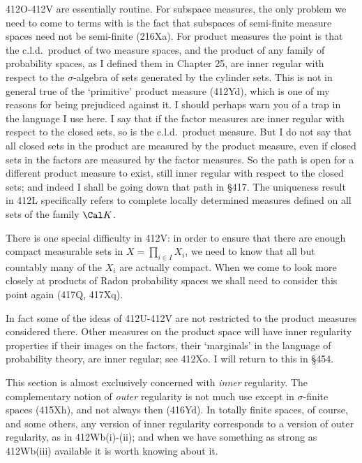 {412O-412V are essentially routine.   For subspace measures, the only
problem we need to come to terms with is the fact that subspaces of
semi-finite measure spaces need not be semi-finite (216Xa).   For
product measures the point is that the c.l.d.\ product of two measure
spaces, and the product of any family of probability spaces, as I
defined them in Chapter 25, are inner regular with respect to the
$\sigma$-algebra
of sets generated by the cylinder sets.   This is not in general true of
the `primitive' product measure (412Yd), which is one of my reasons for
being prejudiced against it.   I should perhaps warn you of a trap in
the language I use here.   I say that if the factor measures are inner
regular with respect to the closed sets, so is the c.l.d.\ product
measure.   But I
do not say that all closed sets in the product are measured by the
product measure, even if closed sets in the factors are measured by
the factor measures.   So the path is open for a different product
measure to exist, still inner regular with respect to the closed sets;
and indeed I
shall be going down that path in \S417.   The uniqueness result in
412L specifically refers to complete locally determined measures defined
on all sets of the family $\Cal K$.

There is one special difficulty in 412V:  in order to ensure that there
are enough compact measurable sets in $X=\prod_{i\in I}X_i$, we need to
know that all but countably many of the $X_i$ are actually compact.
When we come to look more closely at products of Radon probability
spaces we shall need to consider this point again (417Q, 417Xq).

In fact some of the ideas of 412U-412V are not restricted to the product
measures considered there.   Other measures on the product space will
have inner regularity properties if their images on the factors, their
`marginals' in the language of probability theory, are inner regular;
see 412Xo.   I will return to this in \S454.

This section is almost exclusively concerned with {\it inner}
regularity.   The complementary notion of {\it outer} regularity is not
much use except in $\sigma$-finite spaces (415Xh), and not always then
(416Yd).   In totally finite spaces, of course, and some others, any
version of inner regularity corresponds to a version of outer
regularity, as in 412Wb(i)-(ii);  and when we have something as strong
as 412Wb(iii) available it is worth knowing about it.
}%

\discrpage


